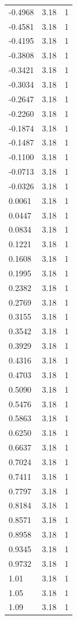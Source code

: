 \begin{longtable}{lrr}
  -0.4968 & 3.18 & 1 \\
  -0.4581 & 3.18 & 1 \\
  -0.4195 & 3.18 & 1 \\
  -0.3808 & 3.18 & 1 \\
  -0.3421 & 3.18 & 1 \\
  -0.3034 & 3.18 & 1 \\
  -0.2647 & 3.18 & 1 \\
  -0.2260 & 3.18 & 1 \\
  -0.1874 & 3.18 & 1 \\
  -0.1487 & 3.18 & 1 \\
  -0.1100 & 3.18 & 1 \\
  -0.0713 & 3.18 & 1 \\
  -0.0326 & 3.18 & 1 \\
  0.0061 & 3.18 & 1 \\
  0.0447 & 3.18 & 1 \\
  0.0834 & 3.18 & 1 \\
  0.1221 & 3.18 & 1 \\
  0.1608 & 3.18 & 1 \\
  0.1995 & 3.18 & 1 \\
  0.2382 & 3.18 & 1 \\
  0.2769 & 3.18 & 1 \\
  0.3155 & 3.18 & 1 \\
  0.3542 & 3.18 & 1 \\
  0.3929 & 3.18 & 1 \\
  0.4316 & 3.18 & 1 \\
  0.4703 & 3.18 & 1 \\
  0.5090 & 3.18 & 1 \\
  0.5476 & 3.18 & 1 \\
  0.5863 & 3.18 & 1 \\
  0.6250 & 3.18 & 1 \\
  0.6637 & 3.18 & 1 \\
  0.7024 & 3.18 & 1 \\
  0.7411 & 3.18 & 1 \\
  0.7797 & 3.18 & 1 \\
  0.8184 & 3.18 & 1 \\
  0.8571 & 3.18 & 1 \\
  0.8958 & 3.18 & 1 \\
  0.9345 & 3.18 & 1 \\
  0.9732 & 3.18 & 1 \\
  1.01 & 3.18 & 1 \\
  1.05 & 3.18 & 1 \\
  1.09 & 3.18 & 1 \\

\end{longtable}
